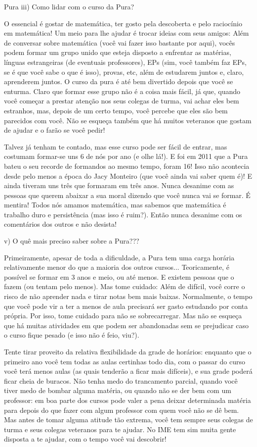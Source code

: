 \begin{subsecao}{Pura}
iii) Como lidar com o curso da Pura?

O essencial é gostar de matemática, ter gosto pela descoberta e pelo raciocínio em matemática! Um meio para lhe ajudar é trocar ideias com seus amigos: Além de conversar sobre matemática (você vai fazer isso bastante por aqui), vocês podem formar um grupo unido que esteja
disposto a enfrentar as matérias, línguas estrangeiras (de eventuais
professores), EPs (sim, você também faz EPs, se é que você sabe o que é isso),
provas, etc, além de estudarem juntos e, claro, aprenderem juntos. O curso da pura
é até bem divertido depois que você se enturma. Claro que
formar esse grupo não é a coisa mais fácil, já que, quando você começar a
prestar atenção nos seus colegas de turma, vai achar eles bem estranhos, mas,
depois de um certo tempo, você percebe que eles são bem parecidos com você. Não se esqueça também que há muitos veteranos que gostam de ajudar e o farão se você pedir!

Talvez já tenham te contado, mas esse curso pode ser fácil de entrar, mas
costumam formar-se uns 6 de nós por ano (e olhe lá!). E foi em 2011 que a Pura bateu o seu recorde de formandos ao mesmo tempo,
foram 16! Isso não acontecia desde pelo menos a época do Jacy Monteiro (que
você ainda vai saber quem é)! E ainda tiveram uns três que formaram em
três anos. Nunca desanime com as pessoas que querem abaixar a sua moral dizendo que você nunca vai se formar. É mentira! Todos nós amamos matemática, mas sabemos que matemática é trabalho duro e persistência (mas isso é ruim?). Então nunca desanime com os comentários dos outros e não desista!

v) O quê mais preciso saber sobre a Pura???

Primeiramente, apesar de toda a dificuldade, a Pura tem uma carga horária
relativamente menor do que a maioria dos outros cursos... Teoricamente, é
possível se formar em 3 anos e meio, ou até menos. E existem pessoas que o
fazem (ou tentam pelo menos). Mas tome cuidado: Além de difícil, você
corre o risco de não aprender nada e tirar notas bem mais baixas. Normalmente,
o tempo que você pode vir a ter a menos de aula precisará ser gasto estudando
por conta própria. Por isso, tome cuidado para não se sobrecarregar. Mas não se esqueça que há muitas atividades em que podem ser abandonadas sem se prejudicar  caso o curso fique pesado (e isso não é feio, viu?).

Tente tirar proveito da relativa flexibilidade da grade de horários: enquanto
que o primeiro ano você tem todas as aulas certinhas todo dia, com o passar do
curso você terá menos aulas (as quais tenderão a ficar mais difíceis), e sua
grade poderá ficar cheia de buracos. Não tenha medo do trancamento parcial,
quando você tiver medo de bombar alguma matéria, ou quando não se der bem com
um professor: em boa parte dos cursos pode valer a pena deixar determinada
matéria para depois do que fazer com algum professor com quem você não se dê
bem. Mas antes de tomar alguma atitude tão extrema, você tem sempre seus colegas de turma e seus colegas veteranos para te ajudar. No IME tem sim muita gente disposta a te ajudar, com o tempo você vai descobrir!


\end{subsecao}
